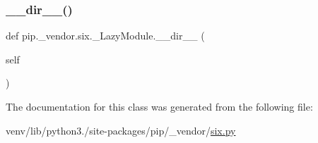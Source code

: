 \subsubsection{\texorpdfstring{\+\_\+\+\_\+dir\+\_\+\+\_\+()}{\_\_dir\_\_()}}
{\footnotesize\ttfamily def pip.\+\_\+vendor.\+six.\+\_\+\+Lazy\+Module.\+\_\+\+\_\+dir\+\_\+\+\_\+ (\begin{DoxyParamCaption}\item[{}]{self }\end{DoxyParamCaption})}



The documentation for this class was generated from the following file\+:\begin{DoxyCompactItemize}
\item 
venv/lib/python3./site-\/packages/pip/\+\_\+vendor/\hyperlink{pip_2__vendor_2six_8py}{six.\+py}\end{DoxyCompactItemize}
